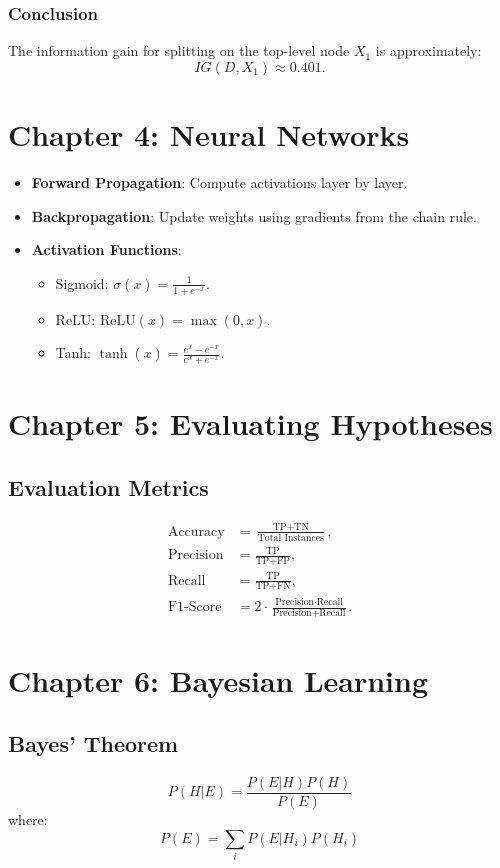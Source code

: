\documentclass[10pt,a4paper]{article}
\begin{document}
\subsubsection*{Conclusion}
The information gain for splitting on the top-level node \(X_1\) is approximately:
\[
IG(D, X_1) \approx 0.401.
\]

\newpage
\section*{Chapter 4: Neural Networks}
\begin{itemize}
	\item \textbf{Forward Propagation}: Compute activations layer by layer.
	\item \textbf{Backpropagation}: Update weights using gradients from the chain rule.
	\item \textbf{Activation Functions}:
	\begin{itemize}
		\item Sigmoid: \( \sigma(x) = \frac{1}{1 + e^{-x}} \).
		\item ReLU: \( \text{ReLU}(x) = \max(0, x) \).
		\item Tanh: \( \tanh(x) = \frac{e^x - e^{-x}}{e^x + e^{-x}} \).
	\end{itemize}
\end{itemize}
\section*{Chapter 5: Evaluating Hypotheses}

\subsection*{Evaluation Metrics}
\begin{align*}
	\text{Accuracy} &= \frac{\text{TP} + \text{TN}}{\text{Total Instances}}, \\
	\text{Precision} &= \frac{\text{TP}}{\text{TP} + \text{FP}}, \\
	\text{Recall} &= \frac{\text{TP}}{\text{TP} + \text{FN}}, \\
	\text{F1-Score} &= 2 \cdot \frac{\text{Precision} \cdot \text{Recall}}{\text{Precision} + \text{Recall}}.
\end{align*}

\section*{Chapter 6: Bayesian Learning}
\subsection*{Bayes' Theorem}
\[
P(H|E) = \frac{P(E|H)P(H)}{P(E)}
\]
where:
\[
P(E) = \sum_i P(E|H_i)P(H_i)
\]
\end{document}
